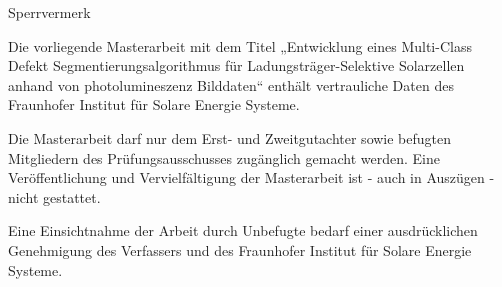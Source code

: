 \thispagestyle{empty}
\large  Sperrvermerk
\vspace{1.5cm}


Die vorliegende Masterarbeit mit dem Titel „Entwicklung eines Multi-Class Defekt Segmentierungsalgorithmus für Ladungsträger-Selektive Solarzellen anhand von photolumineszenz Bilddaten“ enthält vertrauliche Daten des Fraunhofer Institut für Solare Energie Systeme.

Die Masterarbeit darf nur dem Erst- und Zweitgutachter sowie befugten Mitgliedern des Prüfungsausschusses zugänglich gemacht werden. Eine Veröffentlichung und Vervielfältigung der Masterarbeit ist - auch in Auszügen - nicht gestattet.

Eine Einsichtnahme der Arbeit durch Unbefugte bedarf einer ausdrücklichen Genehmigung des Verfassers und des Fraunhofer Institut für Solare Energie Systeme.
